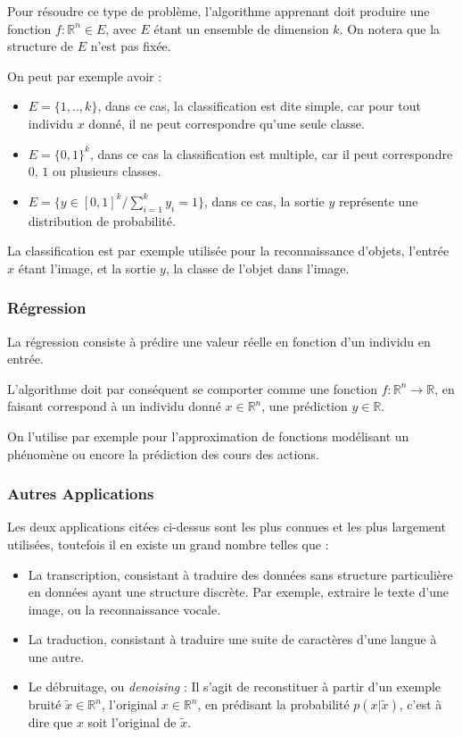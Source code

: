 \documentclass[a4paper, 10pt]{report}
\begin{document}
Pour résoudre ce type de problème, l'algorithme apprenant doit produire une fonction $f : \mathbb{R}^n \in E$, avec $E$ étant un ensemble de dimension $k$.
On notera que la structure de $E$ n'est pas fixée.

On peut par exemple avoir :
\begin{itemize}
	\item $E = \{1,..,k\}$, dans ce cas, la classification est dite simple, car pour tout individu $x$ donné, il ne peut correspondre qu'une seule classe.
	\item $E = \{0,1\}^k$, dans ce cas la classification est multiple, car il peut correspondre $0$, $1$ ou plusieurs classes.
	\item $E = \{y \in [0,1]^k/ \sum_{i=1}^{k}{y_i}=1  \}$, dans ce cas, la sortie $y$ représente une distribution de probabilité.
\end{itemize}
La classification est par exemple utilisée pour la reconnaissance d'objets, l'entrée $x$ étant l'image, et la sortie $y$, la classe de l'objet dans l'image.
\subsubsection{Régression}
La régression consiste à prédire une valeur réelle en fonction d'un individu en entrée.

L'algorithme doit par conséquent se comporter comme une fonction $f : \mathbb{R}^n \rightarrow \mathbb{R}$, en faisant correspond à un individu donné $x \in \mathbb{R}^n$, une prédiction $y \in \mathbb{R}$.

On l'utilise par exemple pour l'approximation de fonctions modélisant un phénomène ou encore la prédiction des cours des actions.
\subsubsection{Autres Applications}
Les deux applications citées ci-dessus sont les plus connues et les plus largement utilisées, toutefois il en existe un grand nombre telles que :
\begin{itemize}
	\item La transcription, consistant à traduire des données sans structure particulière en données ayant une structure discrète. Par exemple, extraire le texte d'une image, ou la reconnaissance vocale.
	\item La traduction, consistant à traduire une suite de caractères d'une langue à une autre.
	\item Le débruitage, ou \emph{denoising} : Il s'agit de reconstituer à partir d'un exemple bruité $\tilde{x} \in \mathbb{R}^n$, l'original $x \in \mathbb{R}^n$, en prédisant la probabilité $p(x|\tilde{x})$, c'est à dire que $x$ soit l'original de $\tilde{x}$.
\end{itemize}
		
\end{document}
